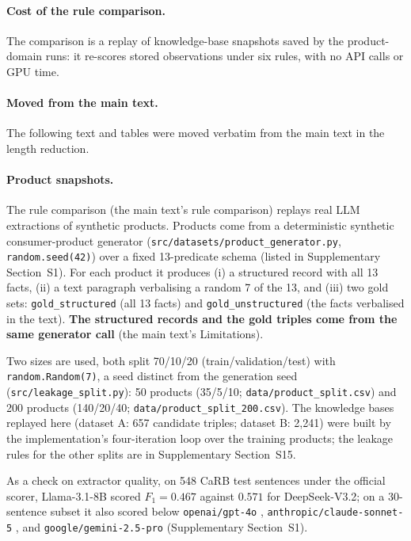 \documentclass[11pt]{article}
\begin{document}
\paragraph{Cost of the rule comparison.} The comparison is a replay of knowledge-base snapshots
saved by the product-domain runs: it re-scores stored observations under
six rules, with no API calls or GPU time.


\paragraph{Moved from the main text.} The following text and tables were moved verbatim from the main text in the length reduction.

\paragraph{Product snapshots.} The rule comparison
(the main text's rule comparison) replays real LLM
extractions of synthetic products. Products come from a
deterministic synthetic consumer-product generator
(\texttt{src/datasets/product\_generator.py}, \texttt{random.seed(42)})
over a fixed 13-predicate schema (listed in Supplementary Section~S1).
For each product it produces (i) a structured record with all 13 facts,
(ii) a text paragraph verbalising a random 7 of the 13, and (iii) two
gold sets: \texttt{gold\_structured} (all 13 facts) and
\texttt{gold\_unstructured} (the facts verbalised in the text).
\textbf{The structured records and the gold triples come from the same
generator call} (the main text's Limitations).

Two sizes are used, both split 70/10/20 (train/validation/test) with
\texttt{random.Random(7)}, a seed distinct from the generation seed
(\texttt{src/leakage\_split.py}): 50 products (35/5/10;
\texttt{data/product\_split.csv}) and 200 products (140/20/40;
\texttt{data/product\_split\_200.csv}). The knowledge bases replayed
here (dataset A: 657 candidate triples; dataset B: 2,241) were built by
the implementation's four-iteration loop over the training products;
the leakage rules for the other splits are in Supplementary
Section~S15.

As a check on extractor quality, on 548 CaRB \citep{bhardwaj2019carb}
test sentences under the official scorer, Llama-3.1-8B scored
$F_1=0.467$ against $0.571$ for DeepSeek-V3.2; on a 30-sentence subset it
also scored below \texttt{openai/gpt-4o} \citep{openai2024gpt4o},
\texttt{anthropic/claude-sonnet-5} \citep{anthropic2026claudesonnet5},
and \texttt{google/gemini-2.5-pro} \citep{comanici2025gemini25}
(Supplementary Section~S1).
\end{document}
